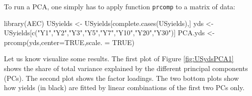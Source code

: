 \documentclass[
  12pt,
]{book}
\newenvironment{Shaded}{\begin{snugshade}}{\end{snugshade}}
\newcommand{\AttributeTok}[1]{\textcolor[rgb]{0.77,0.63,0.00}{#1}}
\newcommand{\ConstantTok}[1]{\textcolor[rgb]{0.00,0.00,0.00}{#1}}
\newcommand{\FunctionTok}[1]{\textcolor[rgb]{0.00,0.00,0.00}{#1}}
\newcommand{\NormalTok}[1]{#1}
\newcommand{\OtherTok}[1]{\textcolor[rgb]{0.56,0.35,0.01}{#1}}
\newcommand{\StringTok}[1]{\textcolor[rgb]{0.31,0.60,0.02}{#1}}
\theoremstyle{definition}
\theoremstyle{definition}
\theoremstyle{definition}
\theoremstyle{definition}
\theoremstyle{remark}
\begin{document}
To run a PCA, one simply has to apply function \texttt{prcomp} to a matrix of data:

\begin{Shaded}
\begin{Highlighting}[]
\FunctionTok{library}\NormalTok{(AEC)}
\NormalTok{USyields }\OtherTok{\textless{}{-}}\NormalTok{ USyields[}\FunctionTok{complete.cases}\NormalTok{(USyields),]}
\NormalTok{yds }\OtherTok{\textless{}{-}}\NormalTok{ USyields[}\FunctionTok{c}\NormalTok{(}\StringTok{"Y1"}\NormalTok{,}\StringTok{"Y2"}\NormalTok{,}\StringTok{"Y3"}\NormalTok{,}\StringTok{"Y5"}\NormalTok{,}\StringTok{"Y7"}\NormalTok{,}\StringTok{"Y10"}\NormalTok{,}\StringTok{"Y20"}\NormalTok{,}\StringTok{"Y30"}\NormalTok{)]}
\NormalTok{PCA.yds }\OtherTok{\textless{}{-}} \FunctionTok{prcomp}\NormalTok{(yds,}\AttributeTok{center=}\ConstantTok{TRUE}\NormalTok{,}\AttributeTok{scale. =} \ConstantTok{TRUE}\NormalTok{)}
\end{Highlighting}
\end{Shaded}

Let us know visualize some results. The first plot of Figure \ref{fig:USydsPCA1} shows the share of total variance explained by the different principal components (PCs). The second plot shows the factor loadings. The two bottom plots show how yields (in black) are fitted by linear combinations of the first two PCs only.
\end{document}
